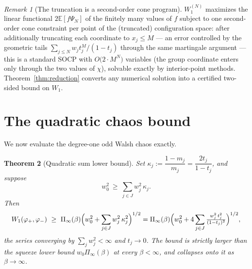 \documentclass[11pt]{amsart}
\newtheorem{theorem}{Theorem}[section]
\theoremstyle{remark}
\newtheorem{remark}[theorem]{Remark}
\newcommand{\E}{\mathbb{E}}
\begin{document}
\begin{remark}[The truncation is a second-order cone program]\label{rem:socp}
$W_1^{(N)}$ maximizes the linear functional $2\E[f\Psi_N]$ of the finitely many values of
$f$ subject to one second-order cone constraint per point of the (truncated) configuration
space: after additionally truncating each coordinate to $x_j\le M$ --- an error controlled
by the geometric tails $\sum_{j\le N}w_jt_j^{M}/(1-t_j)$ through the same martingale
argument --- this is a standard SOCP with $O\bigl(2\cdot M^N\bigr)$ variables (the group
coordinate enters only through the two values of $\chi$), solvable exactly by interior-point
methods. Theorem~\ref{thm:reduction} converts any numerical solution into a certified
two-sided bound on $W_1$.
\end{remark}

\section{The quadratic chaos bound}\label{sec:quadratic}

We now evaluate the degree-one odd Walsh chaos exactly.

\begin{theorem}[Quadratic sum lower bound]\label{thm:quadratic}
Set $\kappa_j:=\dfrac{1-m_j}{m_j}=\dfrac{2t_j}{1-t_j}$, and suppose
\begin{equation}\label{eq:interior}
w_0^2\ \ge\ \sum_{j\in J}w_j^2\,\kappa_j .
\end{equation}
Then
\[
W_1(\varphi_+,\varphi_-)\ \ge\
\Pi_\infty(\beta)\Bigl(w_0^2+\sum_{j\in J}w_j^2\,\kappa_j^2\Bigr)^{1/2}
=\Pi_\infty(\beta)\Bigl(w_0^2+4\sum_{j\in J}\tfrac{w_j^2\,t_j^2}{(1-t_j)^2}\Bigr)^{1/2},
\]
the series converging by $\sum_jw_j^2<\infty$ and $t_j\to0$. The bound is strictly larger
than the squeeze lower bound $w_0\Pi_\infty(\beta)$ at every $\beta<\infty$, and collapses
onto it as $\beta\to\infty$.
\end{theorem}
\end{document}
